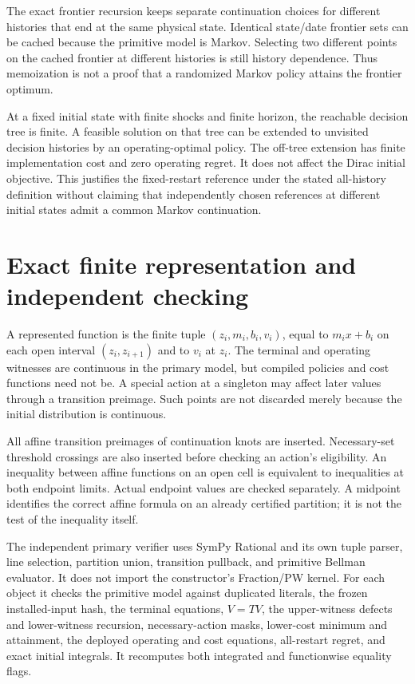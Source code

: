 The exact frontier recursion keeps separate continuation choices for different histories that end at the same physical state. Identical state/date frontier sets can be cached because the primitive model is Markov. Selecting two different points on the cached frontier at different histories is still history dependence. Thus memoization is not a proof that a randomized Markov policy attains the frontier optimum.

At a fixed initial state with finite shocks and finite horizon, the reachable decision tree is finite. A feasible solution on that tree can be extended to unvisited decision histories by an operating-optimal policy. The off-tree extension has finite implementation cost and zero operating regret. It does not affect the Dirac initial objective. This justifies the fixed-restart reference under the stated all-history definition without claiming that independently chosen references at different initial states admit a common Markov continuation.

\section{Exact finite representation and independent checking}
A represented function is the finite tuple $(z_i,m_i,b_i,v_i)$, equal to $m_ix+b_i$ on each open interval $(z_i,z_{i+1})$ and to $v_i$ at $z_i$. The terminal and operating witnesses are continuous in the primary model, but compiled policies and cost functions need not be. A special action at a singleton may affect later values through a transition preimage. Such points are not discarded merely because the initial distribution is continuous.

All affine transition preimages of continuation knots are inserted. Necessary-set threshold crossings are also inserted before checking an action's eligibility. An inequality between affine functions on an open cell is equivalent to inequalities at both endpoint limits. Actual endpoint values are checked separately. A midpoint identifies the correct affine formula on an already certified partition; it is not the test of the inequality itself.

The independent primary verifier uses SymPy Rational and its own tuple parser, line selection, partition union, transition pullback, and primitive Bellman evaluator. It does not import the constructor's Fraction/PW kernel. For each object it checks the primitive model against duplicated literals, the frozen installed-input hash, the terminal equations, $V=TV$, the upper-witness defects and lower-witness recursion, necessary-action masks, lower-cost minimum and attainment, the deployed operating and cost equations, all-restart regret, and exact initial integrals. It recomputes both integrated and functionwise equality flags.

